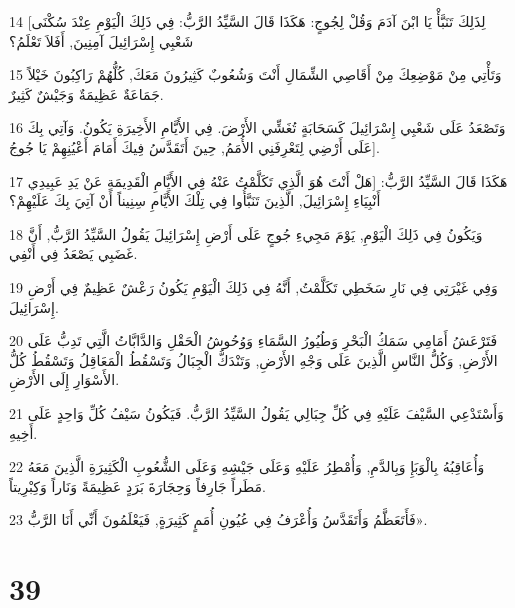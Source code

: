 \par 14 [لِذَلِكَ تَنَبَّأْ يَا ابْنَ آدَمَ وَقُلْ لِجُوجٍ: هَكَذَا قَالَ السَّيِّدُ الرَّبُّ: فِي ذَلِكَ الْيَوْمِ عِنْدَ سُكْنَى شَعْبِي إِسْرَائِيلَ آمِنِينَ, أَفَلاَ تَعْلَمُ؟
\par 15 وَتَأْتِي مِنْ مَوْضِعِكَ مِنْ أَقَاصِي الشِّمَالِ أَنْتَ وَشُعُوبٌ كَثِيرُونَ مَعَكَ, كُلُّهُمْ رَاكِبُونَ خَيْلاً جَمَاعَةٌ عَظِيمَةٌ وَجَيْشٌ كَثِيرٌ.
\par 16 وَتَصْعَدُ عَلَى شَعْبِي إِسْرَائِيلَ كَسَحَابَةٍ تُغَشِّي الأَرْضَ. فِي الأَيَّامِ الأَخِيرَةِ يَكُونُ. وَآتِي بِكَ عَلَى أَرْضِي لِتَعْرِفَنِي الأُمَمُ, حِينَ أَتَقَدَّسُ فِيكَ أَمَامَ أَعْيُنِهِمْ يَا جُوجُ].
\par 17 هَكَذَا قَالَ السَّيِّدُ الرَّبُّ: [هَلْ أَنْتَ هُوَ الَّذِي تَكَلَّمْتُ عَنْهُ فِي الأَيَّامِ الْقَدِيمَةِ عَنْ يَدِ عَبِيدِي أَنْبِيَاءِ إِسْرَائِيلَ, الَّذِينَ تَنَبَّأُوا فِي تِلْكَ الأَيَّامِ سِنِيناً أَنْ آتِيَ بِكَ عَلَيْهِمْ؟
\par 18 وَيَكُونُ فِي ذَلِكَ الْيَوْمِ, يَوْمَ مَجِيءِ جُوجٍ عَلَى أَرْضِ إِسْرَائِيلَ يَقُولُ السَّيِّدُ الرَّبُّ, أَنَّ غَضَبِي يَصْعَدُ فِي أَنْفِي.
\par 19 وَفِي غَيْرَتِي فِي نَارِ سَخَطِي تَكَلَّمْتُ, أَنَّهُ فِي ذَلِكَ الْيَوْمِ يَكُونُ رَعْشٌ عَظِيمٌ فِي أَرْضِ إِسْرَائِيلَ.
\par 20 فَتَرْعَشُ أَمَامِي سَمَكُ الْبَحْرِ وَطُيُورُ السَّمَاءِ وَوُحُوشُ الْحَقْلِ وَالدَّابَّاتُ الَّتِي تَدِبُّ عَلَى الأَرْضِ, وَكُلُّ النَّاسِ الَّذِينَ عَلَى وَجْهِ الأَرْضِ, وَتَنْدَكُّ الْجِبَالُ وَتَسْقُطُ الْمَعَاقِلُ وَتَسْقُطُ كُلُّ الأَسْوَارِ إِلَى الأَرْضِ.
\par 21 وَأَسْتَدْعِي السَّيْفَ عَلَيْهِ فِي كُلِّ جِبَالِي يَقُولُ السَّيِّدُ الرَّبُّ. فَيَكُونُ سَيْفُ كُلِّ وَاحِدٍ عَلَى أَخِيهِ.
\par 22 وَأُعَاقِبُهُ بِالْوَبَإِ وَبِالدَّمِ, وَأُمْطِرُ عَلَيْهِ وَعَلَى جَيْشِهِ وَعَلَى الشُّعُوبِ الْكَثِيرَةِ الَّذِينَ مَعَهُ مَطَراً جَارِفاً وَحِجَارَةَ بَرَدٍ عَظِيمَةً وَنَاراً وَكِبْرِيتاً.
\par 23 فَأَتَعَظَّمُ وَأَتَقَدَّسُ وَأُعْرَفُ فِي عُيُونِ أُمَمٍ كَثِيرَةٍ, فَيَعْلَمُونَ أَنِّي أَنَا الرَّبُّ».

\chapter{39}

